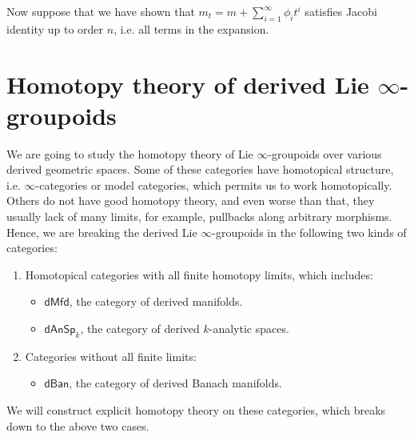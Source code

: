\documentclass[12pt]{amsart}
\theoremstyle{definition}
\theoremstyle{remark}
\numberwithin{equation}{section}
\newcommand{\1}{{\mathbb{1}}}
\newcommand{\dmfd}{\mathsf{dMfd}}
\newcommand{\dan}{\mathsf{dAnSp}}
\newcommand{\dban}{\mathsf{dBan}}
\begin{document}
Now suppose that we have shown that $m_t=m+\sum_{i=1}^{\infty}\phi_i t^i$ satisfies Jacobi identity up to order $n$, i.e. all terms in the expansion.









\part{Homotopy theory of derived Lie $\infty$-groupoids}


We are going to study the homotopy theory of Lie $\infty$-groupoids over various derived geometric spaces. Some of these categories have homotopical structure, i.e. $\infty$-categories or model categories, which permits us to work homotopically. Others do not have good homotopy theory, and even worse than that, they usually lack of many limits, for example, pullbacks along arbitrary morphisms. Hence, we are breaking the derived Lie $\infty$-groupoids in the following two kinds of categories:
\begin{enumerate}
    \item Homotopical categories with all finite homotopy limits, which includes:
    \begin{itemize}
        \item $\dmfd$, the category of derived manifolds.
        \item $\dan_k$, the category of derived $k$-analytic spaces.
    \end{itemize}
    \item Categories without all finite limits:
    \begin{itemize}
        \item $\dban$, the category of derived Banach manifolds.
    \end{itemize}
\end{enumerate}

We will construct explicit homotopy theory on these categories, which breaks down to the above two cases. 
\end{document}
